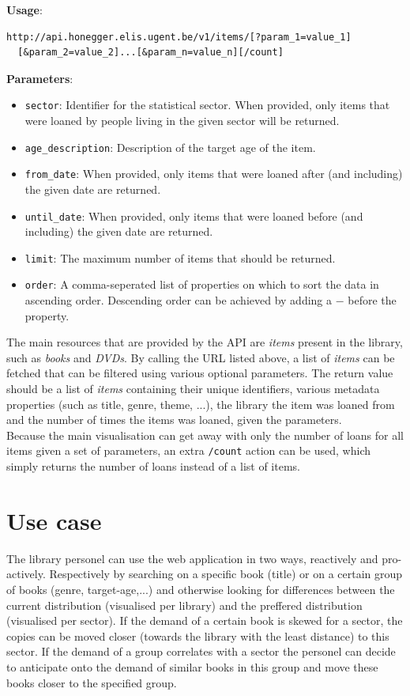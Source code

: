 {\bf Usage}:
\begin{verbatim}
http://api.honegger.elis.ugent.be/v1/items/[?param_1=value_1]
  [&param_2=value_2]...[&param_n=value_n][/count]
\end{verbatim}

{\bf Parameters}:
\begin{itemize}
  \item \texttt{sector}: Identifier for the statistical sector. When provided, only items that were loaned by people living in the given sector will be returned.
  \item \texttt{age\_description}: Description of the target age of the item.
  \item \texttt{from\_date}: When provided, only items that were loaned after (and including) the given date are returned.
  \item \texttt{until\_date}: When provided, only items that were loaned before (and including) the given date are returned.
  \item \texttt{limit}: The maximum number of items that should be returned.
  \item \texttt{order}: A comma-seperated list of properties on which to sort the data in ascending order. Descending order can be achieved by adding a $-$ before the property.
\end{itemize}

The main resources that are provided by the API are \emph{items} present in the library, such as \emph{books} and \emph{DVDs}.
By calling the URL listed above, a list of \emph{items} can be fetched that can be filtered using various optional parameters.
The return value should be a list of \emph{items} containing their unique identifiers, various metadata properties (such as title, genre, theme, ...), the library the item was loaned from and the number of times the items was loaned, given the parameters.\\

Because the main visualisation can get away with only the number of loans for all items given a set of parameters, an extra \texttt{/count} action can be used, which simply returns the number of loans instead of a list of items.

\section{Use case}

The library personel can use the web application in two ways, reactively and pro-actively. Respectively by searching on a specific book (title) or on a certain group of books (genre, target-age,...) and otherwise looking for differences between the current distribution (visualised per library) and the preffered distribution (visualised per sector). If the demand of a certain book is skewed for a sector, the copies can be moved closer (towards the library with the least distance) to this sector. If the demand of a group correlates with a sector the personel can decide to anticipate onto the demand of similar books in this group and move these books closer to the specified group.\\

